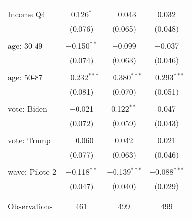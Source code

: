 \begin{tabular}{@{\extracolsep{5pt}}lccc}
  & & & \\ 
 Income Q4 & 0.126$^{*}$ & $-$0.043 & 0.032 \\ 
  & (0.076) & (0.065) & (0.048) \\ 
  & & & \\ 
 age: 30-49 & $-$0.150$^{**}$ & $-$0.099 & $-$0.037 \\ 
  & (0.074) & (0.063) & (0.046) \\ 
  & & & \\ 
 age: 50-87 & $-$0.232$^{***}$ & $-$0.380$^{***}$ & $-$0.293$^{***}$ \\ 
  & (0.081) & (0.070) & (0.051) \\ 
  & & & \\ 
 vote: Biden & $-$0.021 & 0.122$^{**}$ & 0.047 \\ 
  & (0.072) & (0.059) & (0.043) \\ 
  & & & \\ 
 vote: Trump & $-$0.060 & 0.042 & 0.021 \\ 
  & (0.077) & (0.063) & (0.046) \\ 
  & & & \\ 
 wave: Pilote 2 & $-$0.118$^{**}$ & $-$0.139$^{***}$ & $-$0.088$^{***}$ \\ 
  & (0.047) & (0.040) & (0.029) \\ 
  & & & \\ 
\hline \\[-1.8ex] 

Observations & 461 & 499 & 499 \\ 
\hline 
\hline \\[-1.8ex] 
\end{tabular} 